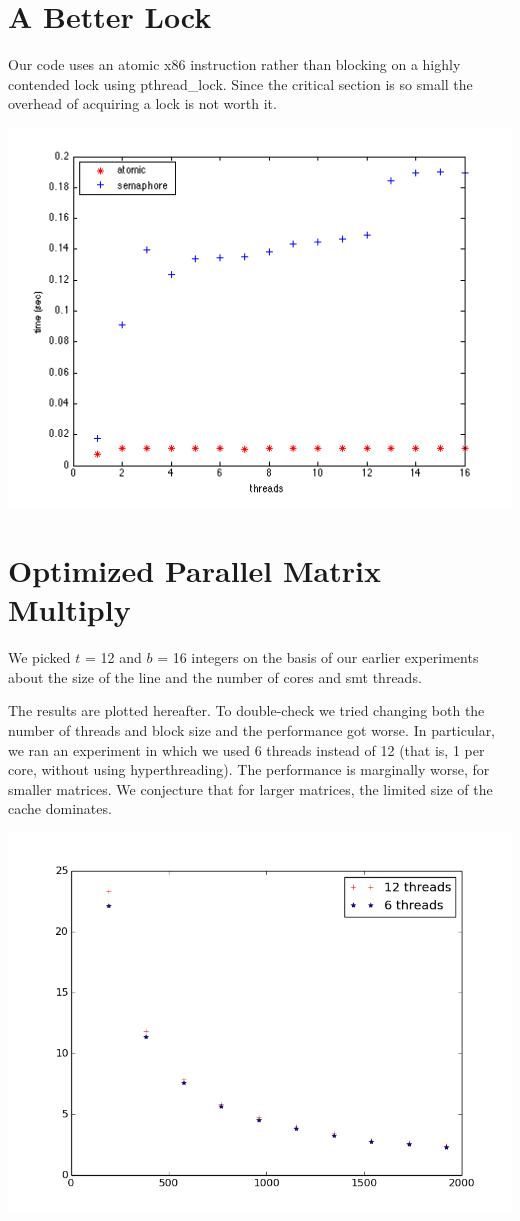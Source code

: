 \documentclass[10pt]{article}
\begin{document}
\section*{A Better Lock}
Our code uses an atomic x86 instruction rather than blocking on a highly
contended lock using pthread\_lock.
Since the critical section is so small the overhead of acquiring a lock is not
worth it.
\begin{center}
\includegraphics[scale=0.50]{images/lock}
\end{center}


\section*{Optimized Parallel Matrix Multiply}
We picked $t$ = 12 and $b$ = 16 integers on the basis of our earlier
experiments about the size of the line and the number of cores and smt threads.

The results are plotted hereafter.  
To double-check we tried changing both the number of threads and block size and
the performance got worse. In particular, we ran an experiment in which we used
6 threads instead of 12 (that is, 1 per core, without using hyperthreading).
The performance is marginally worse, for smaller matrices. We conjecture that
for larger matrices, the limited size of the cache dominates.

\begin{center}
\includegraphics[scale=0.50]{images/matrix}
\end{center}
\end{document}
